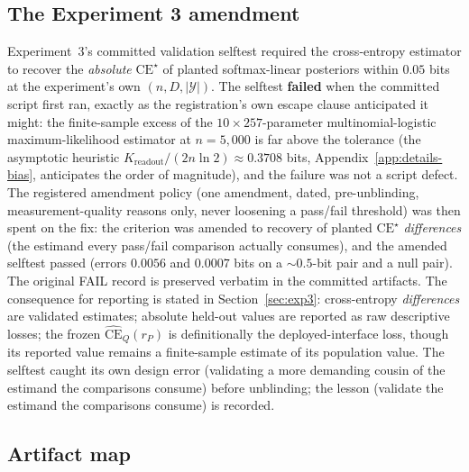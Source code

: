 \documentclass[twocolumn,10pt]{article}
\theoremstyle{definition}
\theoremstyle{remark}
\newcommand{\cY}{\mathcal{Y}}
\newcommand{\CE}{\mathrm{CE}}
\newcommand{\rP}{r_{P}}
\newcommand{\CEhat}{\widehat{\CE}}
\begin{document}
\subsection{The Experiment 3 amendment}
\label{app:protocol-amend}

Experiment~3's committed validation selftest required the
cross-entropy estimator to recover the \emph{absolute}
$\CE^{\star}$ of planted softmax-linear posteriors within $0.05$ bits
at the experiment's own $(n, D, |\cY|)$. The selftest \textbf{failed}
when the committed script first ran, exactly as the registration's own
escape clause anticipated it might: the finite-sample excess
of the $10 \times 257$-parameter multinomial-logistic
maximum-likelihood estimator at $n = 5{,}000$ is far above the
tolerance (the asymptotic heuristic
$K_{\mathrm{readout}} / (2 n \ln 2) \approx 0.3708$ bits,
Appendix~\ref{app:details-bias}, anticipates the order of magnitude),
and the failure was not a script defect. The registered amendment policy
(one amendment, dated, pre-unblinding, measurement-quality reasons
only, never loosening a pass/fail threshold) was then spent on the
fix: the criterion was amended to recovery of planted $\CE^{\star}$
\emph{differences} (the estimand every pass/fail comparison
actually consumes), and the amended selftest passed (errors $0.0056$ and
$0.0007$ bits on a $\sim 0.5$-bit pair and a null pair). The original
FAIL record is preserved verbatim in the committed artifacts. The
consequence for reporting is stated in Section~\ref{sec:exp3}:
cross-entropy \emph{differences} are validated estimates; absolute
held-out values are reported as raw descriptive losses; the frozen
$\CEhat_Q(\rP)$ is definitionally the deployed-interface loss, though
its reported value remains a finite-sample estimate of its population
value. The selftest caught its own design error (validating a more
demanding cousin of the estimand the comparisons consume) before
unblinding; the lesson (validate the estimand the comparisons consume)
is recorded.

\subsection{Artifact map}
\label{app:protocol-artifacts}
\end{document}
